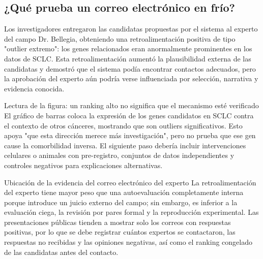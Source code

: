 \subsection{¿Qué prueba un correo electrónico en frío?}

Los investigadores entregaron las candidatas propuestas por el sistema al experto del campo Dr. Bellegia, obteniendo una retroalimentación positiva de tipo "outlier extremo": los genes relacionados eran anormalmente prominentes en los datos de SCLC. Esta retroalimentación aumentó la plausibilidad externa de las candidatas y demostró que el sistema podía encontrar contactos adecuados, pero la aprobación del experto aún podría verse influenciada por selección, narrativa y evidencia conocida.


\begin{knowledgebox}{Lectura de la figura: un ranking alto no significa que el mecanismo esté verificado}
El gráfico de barras coloca la expresión de los genes candidatos en SCLC contra el contexto de otros cánceres, mostrando que son outliers significativos. Esto apoya "que esta dirección merece más investigación", pero no prueba que ese gen cause la comorbilidad inversa. El siguiente paso debería incluir intervenciones celulares o animales con pre-registro, conjuntos de datos independientes y controles negativos para explicaciones alternativas.
\end{knowledgebox}

\begin{warningbox}{Ubicación de la evidencia del correo electrónico del experto}
La retroalimentación del experto tiene mayor peso que una autoevaluación completamente interna porque introduce un juicio externo del campo; sin embargo, es inferior a la evaluación ciega, la revisión por pares formal y la reproducción experimental. Las presentaciones públicas tienden a mostrar solo los correos con respuestas positivas, por lo que se debe registrar cuántos expertos se contactaron, las respuestas no recibidas y las opiniones negativas, así como el ranking congelado de las candidatas antes del contacto.
\end{warningbox}


